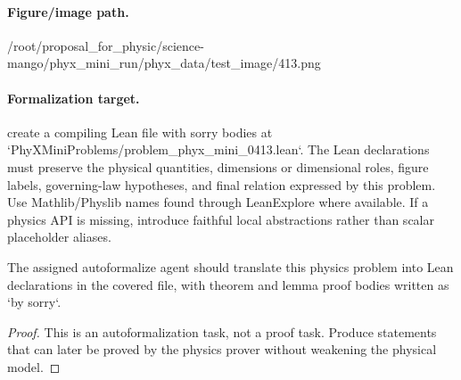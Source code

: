 \paragraph{Figure/image path.}
/root/proposal\_for\_physic/science-mango/phyx\_mini\_run/phyx\_data/test\_image/413.png

\paragraph{Formalization target.}
create a compiling Lean file with sorry bodies at `PhyXMiniProblems/problem\_phyx\_mini\_0413.lean`. The Lean declarations must preserve the physical quantities, dimensions or dimensional roles, figure labels, governing-law hypotheses, and final relation expressed by this problem.
Use Mathlib/Physlib names found through LeanExplore where available. If a physics API is missing, introduce faithful local abstractions rather than scalar placeholder aliases.

\begin{theorem}
\label{thm:physics:phyx_mini_0413:target}
The assigned autoformalize agent should translate this physics problem into Lean declarations in the covered file, with theorem and lemma proof bodies written as `by sorry`.
\end{theorem}
\begin{proof}
This is an autoformalization task, not a proof task. Produce statements that can later be proved by the physics prover without weakening the physical model.
\end{proof}

